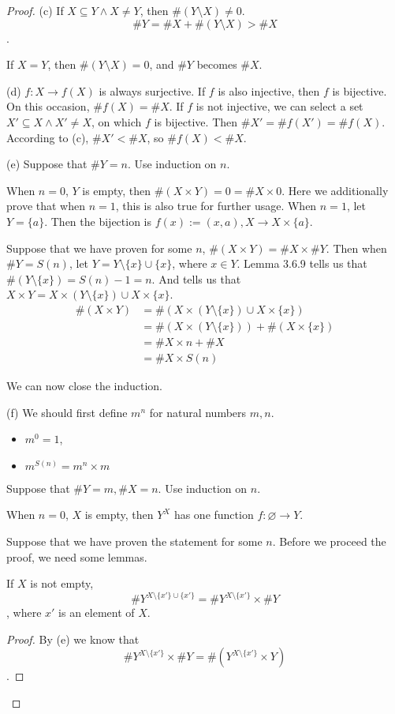 \begin{proof}
(c)
If $X \subseteq Y \wedge X \neq Y$, then $\#(Y \setminus X) \neq 0$. 
\[
\#Y = \#X + \#(Y \setminus X) > \#X
\].

If $X = Y$, then $\#(Y \setminus X) = 0$, and $\#Y$ becomes $\#X$.

(d)
$f: X \rightarrow f(X)$ is always surjective. If $f$ is also injective, then $f$ is bijective. On this 
occasion, $\#f(X) = \#X$. If $f$ is not injective, we can select a set $X' \subseteq X \wedge X' \neq X$, 
on which $f$ is bijective. Then $\#X' = \#f(X') = \#f(X)$. According to (c), $\#X' < \#X$, so 
$\#f(X) < \#X$.

(e)
Suppose that $\#Y = n$. Use induction on $n$. 

When $n=0$, $Y$ is empty, then $\#(X \times Y) = 0 = \#X \times 0$. Here we additionally prove that 
when $n=1$, this is also true for further usage. When $n=1$, let $Y = \{a\}$. Then the bijection is 
$f(x):=(x,a), X \rightarrow X \times \{a\}$.

Suppose that we have proven for some $n$, $\#(X \times Y) = \#X \times \#Y$. Then when $\#Y = S(n)$, 
let $Y = Y\setminus\{x\}\cup\{x\}$, where $x \in Y$. Lemma 3.6.9 tells us that 
$\#(Y\setminus\{x\}) = S(n)-1 = n$. And  tells us that 
$X \times Y = X \times (Y\setminus\{x\}) \cup X \times \{x\}$. 
\begin{align*}
\#(X \times Y) 
&= \#(X \times (Y\setminus\{x\}) \cup X \times \{x\}) \\
&= \#(X \times (Y\setminus\{x\})) + \#(X \times \{x\}) \\
&= \#X \times n + \#X \\
&= \#X \times S(n)
\end{align*}

We can now close the induction.

(f)
We should first define $m^n$ for natural numbers $m,n$. 
\begin{definition}

\begin{itemize}
\item $m^0=1$,
\item $m^{S(n)} = m^n \times m$
\end{itemize}
\end{definition}

Suppose that $\#Y = m,\#X = n$. Use induction on $n$. 

When $n=0$, $X$ is empty, then $Y^X$ has one function $f:\varnothing \rightarrow Y$.

Suppose that we have proven the statement for some $n$. Before we proceed the proof, we need some lemmas.
\begin{lem}
If $X$ is not empty, 
\[
\#Y^{X\setminus\{x'\}\cup\{x'\}} = \#Y^{X\setminus\{x'\}} \times \#Y
\], 
where $x'$ is an element of $X$.
\end{lem}
\begin{proof}
By (e) we know that 
\[
\#Y^{X\setminus\{x'\}} \times \#Y = \#(Y^{X\setminus\{x'\}} \times Y)
\].


\end{proof}
\end{proof}
